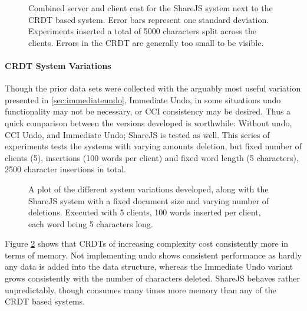 \documentclass[12pt,a4paper,twoside,openright]{report}
\begin{document}
				\begin{figure}[htb]
					\centering
					
					\caption[Memory Consumption versus Replication] {Combined server and client cost for the ShareJS system next to the CRDT based system. Error bars represent one standard deviation. Experiments inserted a total of 5000 characters split across the clients. Errors in the CRDT are generally too small to be visible.}
					\label{fig:memvsreplication}
				\end{figure}
				
			\paragraph{CRDT System Variations}
				Though the prior data sets were collected with the arguably most useful variation presented in \cref{sec:immediateundo}, Immediate Undo, in some situations undo functionality may not be necessary, or CCI consistency may be desired. Thus a quick comparison between the versions developed is worthwhile: Without undo, CCI Undo, and Immediate Undo; ShareJS is tested as well. This series of experiments tests the systems with varying amounts deletion, but fixed number of clients (5), insertions (100 words per client) and fixed word length (5 characters), 2500 character insertions in total.
				
				\begin{figure}[htb]
					\centering
					
					\caption[Behavior of System Variants] {A plot of the different system variations developed, along with the ShareJS system with a fixed document size and varying number of deletions. Executed with 5 clients, 100 words inserted per client, each word being 5 characters long.}
					\label{fig:variantsmemory}
				\end{figure}
				
				Figure \ref{fig:variantsmemory} shows that CRDTs of increasing complexity cost consistently more in terms of memory. Not implementing undo shows consistent performance as hardly any data is added into the data structure, whereas the Immediate Undo variant grows consistently with the number of characters deleted. ShareJS behaves rather unpredictably, though consumes many times more memory than any of the CRDT based systems.
				
\end{document}
